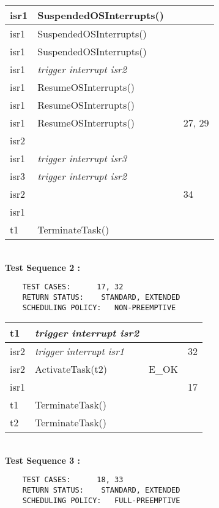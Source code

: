 \documentclass[10pt]{article}
\newlength{\Li}\settowidth{\Li}{Running}
\newlength{\Lii}\setlength{\Lii}{7cm}
\newlength{\Liiii}\setlength{\Liiii}{0.9cm}
\newlength{\Liii}\setlength{\Liii}{\textwidth} \addtolength{\Liii}{-\Li} \addtolength{\Liii}{-\Lii} \addtolength{\Liii}{-\Liiii}
\begin{document}
\begin{supertabular}{|p{\Li}|p{\Lii}|p{\Liii}|p{\Liiii}|}
	isr1 	& SuspendedOSInterrupts()		&  			&  \\ \hline 
	isr1 	& SuspendedOSInterrupts()		&  			&  \\ \hline 
	isr1 	& SuspendedOSInterrupts()		&  			&  \\ \hline 
	isr1 	& \textit{trigger interrupt isr2}		& 		 	&  \\ \hline 
	isr1 	& ResumeOSInterrupts()			&  			&  \\ \hline 
	isr1 	& ResumeOSInterrupts()			&  			&  \\ \hline 
	isr1 	& ResumeOSInterrupts()			&  			& 27, 29 \\ \hline 
	isr2	& 							& 			&  \\ \hline
	isr1	& \textit{trigger interrupt isr3}		& 		 	&  \\ \hline 
	isr3	& \textit{trigger interrupt isr2}		& 		 	&  \\ \hline 
	isr2	&							&			& 34 \\ \hline
	isr1	&							&			& \\ \hline
	t1	& TerminateTask()				& 		 	&  \\ \hline 
	\end{supertabular} \\
	
	\textbf{Test Sequence 2 :}
	\begin{lstlisting}
	TEST CASES:		 17, 32
	RETURN STATUS:	  STANDARD, EXTENDED
	SCHEDULING POLICY:   NON-PREEMPTIVE
	\end{lstlisting}
	
	
	\begin{supertabular}{|p{\Li}|p{\Lii}|p{\Liii}|p{\Liiii}|} \hline 
	t1 	& \textit{trigger interrupt isr2}		& 		 	&  \\ \hline
	isr2	& \textit{trigger interrupt isr1}		& 			& 32 \\ \hline
	isr2	& ActivateTask(t2)				& E\_OK		&  \\ \hline
	isr1	&							&			& 17 \\ \hline
	t1 	& TerminateTask()				& 		 	&  \\ \hline 
	t2 	& TerminateTask()				& 		 	&  \\ \hline
	\end{supertabular} \\

	\textbf{Test Sequence 3 :}
	\begin{lstlisting}
	TEST CASES:		 18, 33
	RETURN STATUS:	  STANDARD, EXTENDED
	SCHEDULING POLICY:   FULL-PREEMPTIVE
	\end{lstlisting}
	
	
\end{document}
